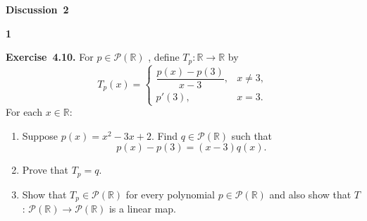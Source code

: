 \documentclass[11pt]{article}
\newcommand{\AssignmentType}{Discussion} %
\newcommand{\AssignmentNumber}{2}
\newcommand{\ProblemDivider}[1]{%
  \vspace{1.0em}
  \noindent\textbf{#1}\par
  \vspace{0.35em}
}
\newcommand{\ProblemAnnounce}{\noindent}
\newcommand{\Exercise}[1]{\textbf{Exercise~#1.}\;}
\begin{document}
\begin{center}
  {\Large \textbf{\AssignmentType~\AssignmentNumber}}
\end{center}
\vspace{0.75em}

\ProblemDivider{1}

\begin{problemBox}
\ProblemAnnounce
\Exercise{4.10}
For \(p \in \mathcal{P}(\mathbb{R})\) , define \(T_{p} : \mathbb{R} \longrightarrow \mathbb{R}\) by
\[
T_{p}(x) =
\begin{cases}
\dfrac{p(x) - p(3)}{x-3}, & x \neq 3, \\[10pt]
p'(3), & x = 3.
\end{cases}
\]
For each \(x\in \mathbb{R}\):
\begin{enumerate}
  \item[(a)] Suppose \(p(x) = x^{2} - 3x + 2\). Find \(q\in \mathcal{P}(\mathbb{R})\) such that
  \[
  p(x) - p(3) = (x - 3)q(x).
  \]
  \item[(b)] Prove that \(T_{p} = q\).
  \item[(c)] Show that \(T_{p}\in \mathcal{P}(\mathbb{R})\) for every polynomial \(p\in \mathcal{P}(\mathbb{R})\) and also show that \(T\) : \(\mathcal{P}(\mathbb{R})\longrightarrow \mathcal{P}(\mathbb{R})\) is a linear map.
\end{enumerate}
\end{problemBox}
\end{document}

